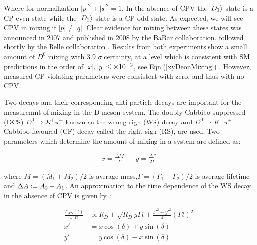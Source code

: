 \noindent Where for normailzation $|p|^{2}+|q|^{2} = 1$. In the absence of CPV the $\ket{D_{1}}$ state is a CP even state while the $\ket{D_{2}}$ state is a CP odd state. As expected, we will see CPV in mixing if $|p| \neq |q|$. Clear evidence for mixing between these states was announced in 2007 and published in 2008 by the BaBar collaboration, followed shortly by the Belle collaboration \cite{BabarD0mixing}\cite{BelleD0mixing}. Results from both experiments show a small amount of $D^{0}$ mixing with 3.9 $\sigma$ certainty, at a level which is consistent with SM predictions in the order of $|x|,|y| \leq \times 10^{-2}$, see Eqn.(\ref{xyDeonMixing}) \cite{Babar_D0_Review}. However, measured CP violating parameters were consistent with zero, and thus with no CPV.

Two decays and their corresponding anti-particle decays are important for the measuremnt of mixing in the D-meson system. The doubly Cabbibo suppressed (DCS) $D^{0} \rightarrow K^{+} \pi^{-}$ known as the wrong sign (WS) decay and $D^{0} \rightarrow K^{-} \pi^{+}$ Cabbibo favoured (CF) decay called the right sign (RS), are used. Two parameters which determine the amount of mixing in a system are defined as:

\begin{align}\label{xyDeonMixing}
x = \frac{\Delta M}{\Gamma} & & y = \frac{\Delta \Gamma}{2 \Gamma}
\end{align}

\noindent where $M= (M_{1}+M_{2})/2$ is average mass,$\Gamma = (\Gamma_{1}+\Gamma_{2})/2$ is average lifetime and $\Delta A \vcentcolon= A_{2} - A_{1}$. An approximation to the time dependence of the WS decay in the absence of CPV is given by \cite{BabarD0mixing}:

\begin{align*}
\frac{T_{WS}(t)}{e^{-\Gamma t}} & \propto R_{D} + \sqrt{R_{D}} y \Gamma t + \frac{{x'}^2 + {y'}^2}{4} (\Gamma t)^{2} \\
                             x' & = x \cos (\delta) + y \sin (\delta)\\
                             y' & = y \cos (\delta) - x \sin (\delta)
\end{align*}

